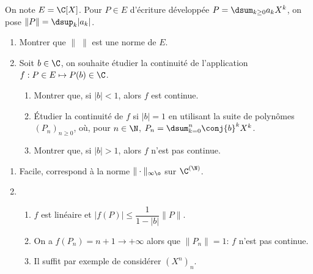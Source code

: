 \begin{enonce}
\begin{exercise}[ID={RMS134 E1462},subtitle={CCINP MP 2023},theme={analyse},concours={ccinp},annee={2023},filiere={MP}]
  On note $E=\C[X]$. Pour $P\in E$ d'écriture développée
  $P=\dsum_{k\ge 0}a_kX^k$, on pose $\|P\|=\dsup_{k}|a_k|$.
  \begin{enumerate}
  \item Montrer que $\|\;\|$ est une norme de $E$.
  \item Soit $b\in\C$, on souhaite étudier la continuité de
    l'application $f:P\in E\mapsto P(b)\in\C$.
    \begin{enumerate}
    \item Montrer que, si $|b|<1$, alors $f$ est continue.
    \item Étudier la continuité de $f$ si $|b|=1$ en utilisant la
      suite de polynômes $(P_n)_{n\ge 0}$, où, pour $n\in\N$,
      $P_n=\dsum_{k=0}^n\conj{b}^kX^k$.
    \item Montrer que, si $|b|>1$, alors $f$ n'est pas continue.
    \end{enumerate}
  \end{enumerate}
\end{exercise}
\begin{solution}
  \begin{enumerate}
  \item Facile, correspond à la norme $\|\cdot\|_{\inftyø}$ sur $\C^{(\N)}$.
  \item
    \begin{enumerate}
    \item $f$ est linéaire et $|f(P)|\le \dfrac1{1-|b|}\|P\|$.
    \item On a $f(P_n)=n+1\to +\infty$ alors que $\|P_n\|=1$: $f$
      n'est pas continue.
    \item Il suffit par exemple de considérer $(X^n)_n$. 
    \end{enumerate}
  \end{enumerate}
\end{solution}
\end{enonce}